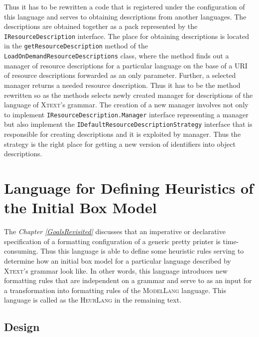\documentclass[12pt,notitlepage,a4paper]{report}
\begin{document}
Thus it has to be rewritten a code that is registered under the configuration of this language and serves to obtaining descriptions from another languages. The descriptions are obtained together as a pack represented by the \texttt{IResourceDescription} interface. The place for obtaining descriptions is  located in the \texttt{getResourceDescription} method of the \texttt{LoadOnDemandResourceDescriptions} class, where the method finds out a manager of resource descriptions for a particular language on the base of a URI of resource descriptions forwarded as an only parameter. Further, a selected manager returns a needed resource description. Thus it has to be the method rewritten so as the methods selects newly created manager for descriptions of the language of \textsc{Xtext}'s grammar. The creation of a new manager involves not only to implement \texttt{IResourceDescription.Manager} interface representing a manager but also implement the \texttt{IDefaultResourceDescriptionStrategy} interface that is responsible for creating descriptions and it is exploited by manager. Thus the strategy is the right place for getting a new version of identifiers into object descriptions.

\chapter {Language for Defining Heuristics of the Initial Box Model}
\label{LanguageOfHeuristics}
The \textit{Chapter \ref{GoalsRevisited}} discusses that an imperative or declarative specification of a formatting configuration of a generic pretty printer is time-consuming. Thus this language is able to define some heuristic rules serving to determine how an initial box model for a particular language described by \textsc{Xtext}'s grammar look like. In other words, this language introduces new formatting rules that are independent on a grammar and serve to as an input for a transformation into formatting rules of the \textsc{ModelLang} language. This language is called as the \textsc{HeurLang} in the remaining text. 

\section{Design}
\end{document}
